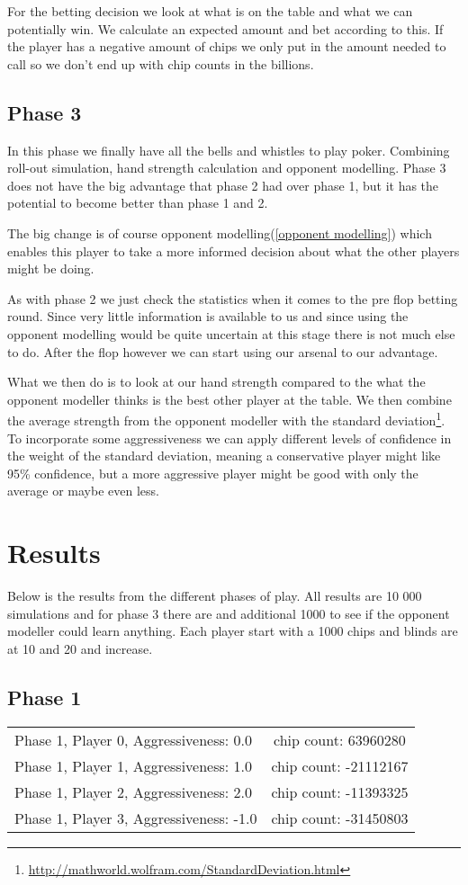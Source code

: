 \documentclass[titlepage, a4paper]{article}
\begin{document}
For the betting decision we look at what is on the table and what we can potentially
win. We calculate an expected amount and bet according to this. If the player has a negative
amount of chips we only put in the amount needed to call so we don't end up with chip counts in the
billions.


\subsection{Phase 3}\label{phase 3 player}
In this phase we finally have all the bells and whistles to play poker. Combining
roll-out simulation, hand strength calculation and opponent modelling. Phase 3 does
not have the big advantage that phase 2 had over phase 1, but it has the potential
to become better than phase 1 and 2.

The big change is of course opponent modelling(\ref{opponent modelling}) which enables
this player to take a more informed decision about what the other players might be
doing.

As with phase 2 we just check the statistics when it comes to the pre flop betting round.
Since very little information is available to us and since using the opponent modelling
would be quite uncertain at this stage there is not much else to do. After the
flop however we can start using our arsenal to our advantage.

What we then do is
to look at our hand strength compared to the what the opponent modeller thinks is
the best other player at the table. We then combine the average strength from the
opponent modeller with the standard deviation\footnote{\url{http://mathworld.wolfram.com/StandardDeviation.html}}. To incorporate some aggressiveness we can apply different levels of confidence
in the weight of the standard deviation, meaning a conservative player might like
95\% confidence, but a more aggressive player might be good with only the average
or maybe even less.

 
\section{Results}\label{results}
Below is the results from the different phases of play. All results are 10 000 simulations
and for phase 3 there are and additional 1000 to see if the opponent modeller could learn
anything. Each player start with a 1000 chips and blinds are at 10 and 20 and increase.

\subsection{Phase 1}\label{phase 1 results}
\begin{tabular}{| l | c |}
	\hline
	Phase 1, Player 0, Aggressiveness: 0.0 & chip count: 63960280\\
	Phase 1, Player 1, Aggressiveness: 1.0 & chip count: -21112167\\
	Phase 1, Player 2, Aggressiveness: 2.0 & chip count: -11393325\\
	Phase 1, Player 3, Aggressiveness: -1.0 & chip count: -31450803\\
	\hline
\end{tabular}
\end{document}
